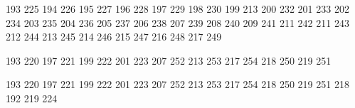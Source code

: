 %
%

 193 225 %
 194 226 %
 195 227 %
 196 228 %
 197 229 %
 198 230 %
 199 213 %
 200 232 %
 201 233 %
 202 234 %
 203 235 %
 204 236 %
 205 237 %
 206 238 %
 207 239 %
 208 240 %
 209 241 %
 211 242 %
 211 243 %
 212 244 %
 213 245 %
 214 246 %
 215 247 %
 216 248 %
 217 249 %

%
%

 193 220  %
 197 221  %
 199 222  %
 201 223  %
 207 252  %
 213 253  %
 217 254  %
 218 250  %
 219 251  %

%
%

 193 220  %
 197 221  %
 199 222  %
 201 223  %
 207 252  %
 213 253  %
 217 254  %
 218 250  %
 219 251  %
 218 192  %
 219 224  %


\stopencoding 

\startencoding[iso-8859-7]

%
%

